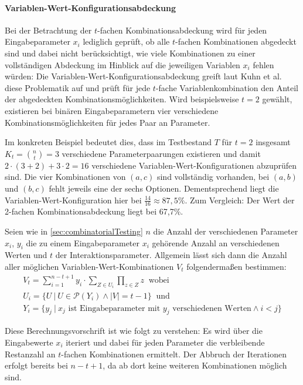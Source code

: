 \paragraph{Variablen-Wert-Konfigurationsabdeckung}

Bei der Betrachtung der $t$-fachen Kombinationsabdeckung wird für jeden Eingabeparameter $x_i$ lediglich geprüft, ob alle $t$-fachen Kombinationen abgedeckt sind und dabei nicht berücksichtigt, wie viele Kombinationen zu einer vollständigen Abdeckung im Hinblick auf die jeweiligen Variablen $x_i$ fehlen würden: Die Variablen-Wert-Konfigurationsabdeckung greift laut Kuhn et al. \cite{kuhn2010practical} diese Problematik auf und prüft für jede $t$-fache Variablenkombination den Anteil der abgedeckten Kombinationsmöglichkeiten. Wird beispielsweise $t=2$ gewählt, existieren bei binären Eingabeparametern vier verschiedene Kombinationsmöglichkeiten für jedes Paar an Parameter.
  
Im konkreten Beispiel bedeutet dies, dass im Testbestand $T$ für $t=2$ insgesamt $K_t = \binom{n}{t} = 3$ verschiedene Parameterpaarungen existieren und damit $2 \cdot (3 + 2) + 3 \cdot 2 = 16$ verschiedene Variablen-Wert-Konfigurationen abzuprüfen sind. Die vier Kombinationen von $(a,c)$ sind vollständig vorhanden, bei $(a,b)$ und $(b,c)$ fehlt jeweils eine der sechs Optionen. Dementsprechend liegt die Variablen-Wert-Konfiguration hier bei $\frac{14}{16} \approx 87,5 \%$. Zum Vergleich: Der Wert der 2-fachen Kombinationsabdeckung liegt bei 67,7\%.

Seien wie in \autoref{sec:combinatorialTesting} $n$ die Anzahl der verschiedenen Parameter $x_i$, $y_i$ die zu einem Eingabeparameter $x_i$ gehörende Anzahl an verschiedenen Werten und $t$ der Interaktionsparameter. Allgemein lässt sich dann die Anzahl aller möglichen Variablen-Wert-Kombinationen $V_{t}$ folgendermaßen bestimmen:
\begin{gather*}
V_t = \sum_{i = 1}^{n-t+1} y_i \cdot \sum_{Z \in U_i} \prod_{z \in Z} z ~\text{ wobei} \\
U_i = \{U ~ | ~ U \in \mathcal{P}(Y_i) \land |V| = t-1\}  ~\text{ und} \\
Y_i = \{y_j ~ | ~ x_j \text{ ist Eingabeparameter mit $y_j$ verschiedenen Werten} \land i < j\}  
\end{gather*}

Diese Berechnungsvorschrift ist wie folgt zu verstehen: Es wird über die Eingabewerte $x_i$ iteriert und dabei für jeden Parameter die verbleibende Restanzahl an $t$-fachen Kombinationen ermittelt. Der Abbruch der Iterationen erfolgt bereits bei $n-t+1$, da ab dort keine weiteren Kombinationen möglich sind. 

